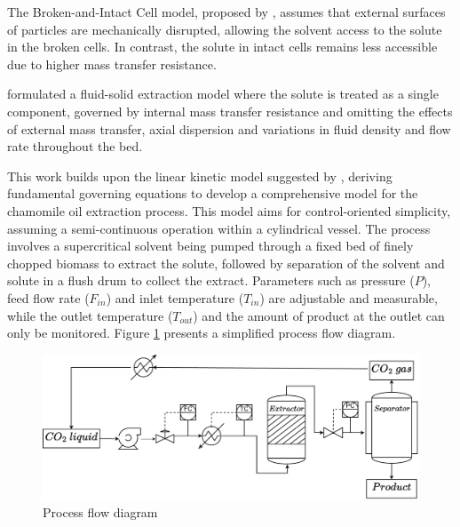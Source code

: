\documentclass[../Article_Model_Parameters.tex]{subfiles}
\begin{document}
	The Broken-and-Intact Cell model, proposed by \citet{Sovova1994}, assumes that external surfaces of particles are mechanically disrupted, allowing the solvent access to the solute in the broken cells. In contrast, the solute in intact cells remains less accessible due to higher mass transfer resistance.
	
	\citet{Reverchon1996} formulated a fluid-solid extraction model where the solute is treated as a single component, governed by internal mass transfer resistance and omitting the effects of external mass transfer, axial dispersion and variations in fluid density and flow rate throughout the bed.
	
	This work builds upon the linear kinetic model suggested by \citet{Reverchon1996}, deriving fundamental governing equations to develop a comprehensive model for the chamomile oil extraction process. This model aims for control-oriented simplicity, assuming a semi-continuous operation within a cylindrical vessel. The process involves a supercritical solvent being pumped through a fixed bed of finely chopped biomass to extract the solute, followed by separation of the solvent and solute in a flush drum to collect the extract. Parameters such as pressure ($P$), feed flow rate ($F_{in}$) and inlet temperature ($T_{in}$) are adjustable and measurable, while the outlet temperature ($T_{out}$) and the amount of product at the outlet can only be monitored. Figure \ref{fig: SFE_drawing} presents a simplified process flow diagram.
	
	\begin{figure}[!ht]
		\centering
		\includegraphics[width=\columnwidth]{Figures/PFD.drawio.pdf}
		\caption{Process flow diagram}
		\label{fig: SFE_drawing}
	\end{figure}
	
\end{document}
